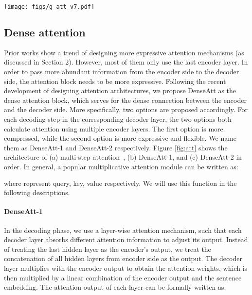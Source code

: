 \documentclass[11pt,a4paper]{article}
\begin{document}
\begin{figure*}[t]
\centering 
\captionsetup{font=small}
\texttt{[image: figs/g\_att\_v7.pdf]}
\caption{Illustration of DenseAtt mechanisms. For clarity, We only plot the attention block for a single decoder layer. (a): multi-step attention~\cite{convs2s}, (b): DenseAtt-1, (c): DenseAtt-2.  is the linear projection function. The ellipsoid stands for the core attention operation as shown in Eq. (\ref{eqt:att}).}
\label{fig:att}
\end{figure*}

\subsection{Dense attention}

Prior works show a trend of designing more expressive attention mechanisms (as discussed in Section 2). However, most of them only use the last encoder layer.
In order to pass more abundant information from the encoder side to the decoder side, the attention block needs to be more expressive.
Following the recent development of designing attention architectures, we propose DenseAtt as the dense attention block, which serves for the dense connection between the encoder and the decoder side. 
More specifically, two options are proposed accordingly. 
For each decoding step in the corresponding decoder layer, the two options both calculate attention using multiple encoder layers. The first option is more compressed, while the second option is more expressive and flexible. We name them as DenseAtt-1 and DenseAtt-2 respectively. Figure \ref{fig:att}  shows the architecture of (a) multi-step attention~\cite{convs2s}, (b) DenseAtt-1, and (c) DenseAtt-2 in order. 
In general, a popular multiplicative attention module can be written as:

where  represent query, key, value respectively. We will use this function  in the following descriptions.

\paragraph{DenseAtt-1}
In the decoding phase, we use a layer-wise attention mechanism, such that each decoder layer absorbs different attention information to adjust its output. Instead of treating the last hidden layer as the encoder's output, we treat the concatenation of all hidden layers from encoder side as the output. The decoder layer multiplies with the encoder output to obtain the attention weights, which is then multiplied by a linear combination of the encoder output and the sentence embedding. The attention output of each layer  can be formally written as:
\end{document}
